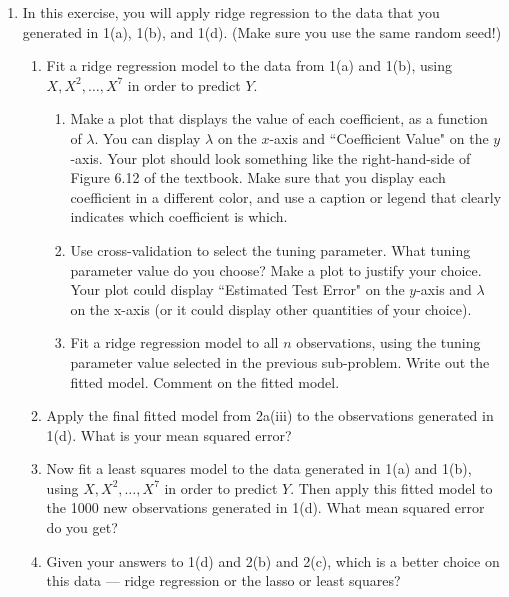 \documentclass[12pt]{article}
\begin{document}
\begin{enumerate}
\item In this exercise, you will  apply ridge regression to the data that you generated in 1(a), 1(b), and 1(d). (Make sure you use the same random seed!) 
\begin{enumerate}
\item Fit a ridge regression model to the data from 1(a) and 1(b), using  $X,X^2,\ldots,X^{7}$ in order to predict $Y$. 
\begin{enumerate}
\item Make a plot that displays the value of each coefficient, as a function of $\lambda$. You can display  $\lambda$ on the $x$-axis and ``Coefficient Value" on the $y$-axis. Your plot should look something like the right-hand-side of Figure 6.12 of the textbook. Make sure that you display each coefficient in a different color, and use a caption or legend that clearly indicates which coefficient is which. 

\item  Use cross-validation to select the tuning parameter. What tuning parameter value do you choose? Make a plot  to justify your choice. Your plot could display ``Estimated Test Error" on the $y$-axis and $\lambda$ on the x-axis (or it could display other quantities of your choice). 
\item Fit a ridge regression model to all $n$ observations, using the tuning parameter value selected in the previous sub-problem. Write out the fitted model. Comment on the fitted model.
\end{enumerate}
\item  Apply the final fitted model from 2a(iii) to the observations generated in 1(d). What is your mean squared error?
\item Now fit a least squares model to the data generated in 1(a) and 1(b), using  $X,X^2,\ldots,X^{7}$ in order to predict $Y$. 
 Then apply this fitted model to the 1000 new observations generated in 1(d). What mean squared error do you get?
\item Given your answers to 1(d) and 2(b) and 2(c), which is a better choice on this data --- ridge regression or the lasso or least squares?
\end{enumerate}





\end{enumerate}
\end{document}
